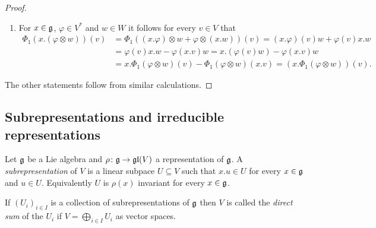 \begin{proof}
 \begin{enumerate}[leftmargin=*]
  \item
   For $x \in \mathfrak{g}$, $\varphi \in V^*$ and $w \in W$ it follows for every $v \in V$ that
   \begin{align*}
    \Phi_1(x.(\varphi \otimes w))(v)
    &= \Phi_1((x.\varphi) \otimes w + \varphi \otimes (x.w))(v)
    = (x.\varphi)(v) w + \varphi(v) x.w \\
    &= \varphi(v) x.w -\varphi(x.v) w
    = x.(\varphi(v) w) - \varphi(x.v) w \\
    &= x.\Phi_1(\varphi \otimes w)(v) - \Phi_1(\varphi \otimes w)(x.v)
    = (x.\Phi_1(\varphi \otimes w))(v).
   \end{align*}
 \end{enumerate}
 The other statements follow from similar calculations.
\end{proof}







\subsection{Subrepresentations and irreducible representations}


\begin{defi}
 Let $\mathfrak{g}$ be a Lie algebra and $\rho \colon \mathfrak{g} \to \mathfrak{gl}(V)$ a representation of $\mathfrak{g}$. A \emph{subrepresentation} of $V$ is a linear subpace $U \subseteq V$ such that $x.u \in U$ for every $x \in \mathfrak{g}$ and $u \in U$. Equivalently $U$ is $\rho(x)$ invariant for every $x \in \mathfrak{g}$.
 
 If $(U_i)_{i \in I}$ is a collection of subrepresentations of $\mathfrak{g}$ then $V$ is called the \emph{direct sum} of the $U_i$ if $V = \bigoplus_{i \in I} U_i$ as vector spaces.
\end{defi}


